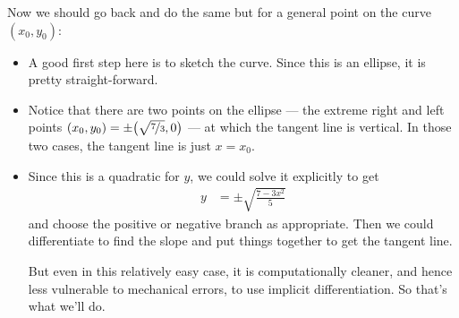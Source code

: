 \begin{eg}
Now we should go back and do the same but for a general point on the curve
$(x_0,y_0)$:
\begin{itemize}
  \item A good first step here is to sketch the curve. Since this is an
ellipse, it is pretty straight-forward.
 \item Notice that there are two points on the ellipse --- the extreme right
and left points  $(x_0,y_0)=\pm\big(\sqrt{\nicefrac{7}{3}},0\big)$ --- at
which the tangent line is vertical. In those two cases, the tangent line is
just $x=x_0$.


\item Since this is a quadratic for $y$, we could solve it explicitly to get
\begin{align*}
y &= \pm \sqrt{\frac{7-3x^2}{5}}
\end{align*}
and choose the positive or negative branch as appropriate. Then we could
differentiate to find the slope and put things together to get the tangent line.



But even in this relatively easy case, it is computationally cleaner,
and hence less vulnerable to mechanical errors, to use implicit
differentiation. So that's what we'll do.


\end{itemize}
\end{eg}
